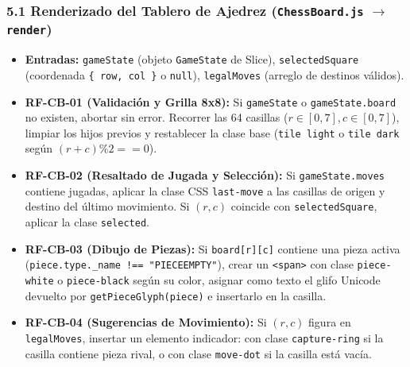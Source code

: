 \documentclass[10pt,letterpaper]{article}
\begin{document}
\subsubsection*{5.1 Renderizado del Tablero de Ajedrez (\texttt{ChessBoard.js} $\rightarrow$ \texttt{render})}
\begin{itemize}[leftmargin=*,itemsep=1.5pt]
    \item \textbf{Entradas:} \texttt{gameState} (objeto \texttt{GameState} de Slice), \texttt{selectedSquare} (coordenada \lstinline|{ row, col }| o \texttt{null}), \texttt{legalMoves} (arreglo de destinos válidos).
    \item \textbf{RF-CB-01 (Validación y Grilla 8x8):} Si \texttt{gameState} o \texttt{gameState.board} no existen, abortar sin error. Recorrer las 64 casillas ($r \in [0,7], c \in [0,7]$), limpiar los hijos previos y restablecer la clase base (\lstinline|tile light| o \lstinline|tile dark| según $(r+c)\%2 == 0$).
    \item \textbf{RF-CB-02 (Resaltado de Jugada y Selección):} Si \texttt{gameState.moves} contiene jugadas, aplicar la clase CSS \lstinline|last-move| a las casillas de origen y destino del último movimiento. Si $(r,c)$ coincide con \texttt{selectedSquare}, aplicar la clase \lstinline|selected|.
    \item \textbf{RF-CB-03 (Dibujo de Piezas):} Si \texttt{board[r][c]} contiene una pieza activa (\lstinline|piece.type._name !== "PIECEEMPTY"|), crear un \lstinline|<span>| con clase \lstinline|piece-white| o \lstinline|piece-black| según su color, asignar como texto el glifo Unicode devuelto por \lstinline|getPieceGlyph(piece)| e insertarlo en la casilla.
    \item \textbf{RF-CB-04 (Sugerencias de Movimiento):} Si $(r,c)$ figura en \texttt{legalMoves}, insertar un elemento indicador: con clase \lstinline|capture-ring| si la casilla contiene pieza rival, o con clase \lstinline|move-dot| si la casilla está vacía.
\end{itemize}
\end{document}
